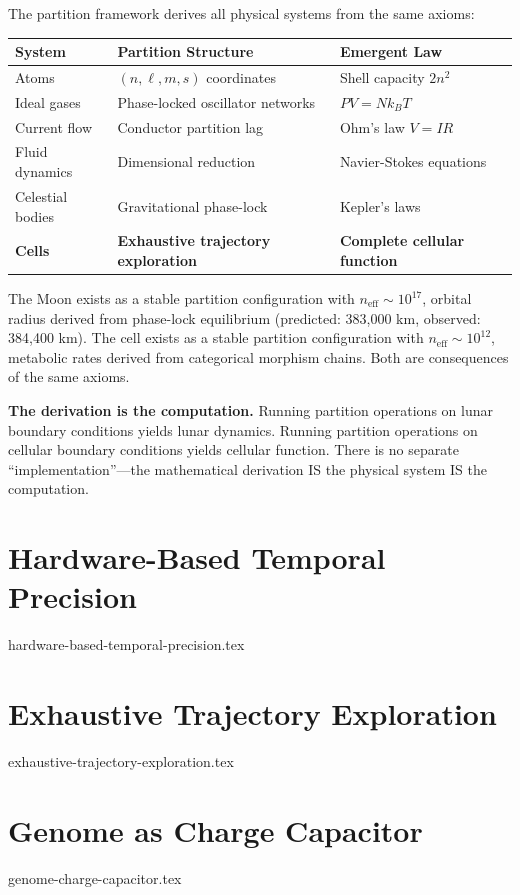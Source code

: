\documentclass[11pt,a4paper]{article}
\theoremstyle{remark}
\begin{document}
The partition framework derives all physical systems from the same axioms:

\begin{center}
\begin{tabular}{lll}
\toprule
\textbf{System} & \textbf{Partition Structure} & \textbf{Emergent Law} \\
\midrule
Atoms & $(n, \ell, m, s)$ coordinates & Shell capacity $2n^2$ \\
Ideal gases & Phase-locked oscillator networks & $PV = Nk_BT$ \\
Current flow & Conductor partition lag & Ohm's law $V = IR$ \\
Fluid dynamics & Dimensional reduction & Navier-Stokes equations \\
Celestial bodies & Gravitational phase-lock & Kepler's laws \\
\textbf{Cells} & \textbf{Exhaustive trajectory exploration} & \textbf{Complete cellular function} \\
\bottomrule
\end{tabular}
\end{center}

The Moon exists as a stable partition configuration with $n_{\text{eff}} \sim 10^{17}$, orbital radius derived from phase-lock equilibrium (predicted: 383,000 km, observed: 384,400 km). The cell exists as a stable partition configuration with $n_{\text{eff}} \sim 10^{12}$, metabolic rates derived from categorical morphism chains. Both are consequences of the same axioms.

\textbf{The derivation is the computation.} Running partition operations on lunar boundary conditions yields lunar dynamics. Running partition operations on cellular boundary conditions yields cellular function. There is no separate ``implementation''---the mathematical derivation IS the physical system IS the computation.

\section{Hardware-Based Temporal Precision}
{hardware-based-temporal-precision.tex}

\section{Exhaustive Trajectory Exploration}
{exhaustive-trajectory-exploration.tex}

\section{Genome as Charge Capacitor}
{genome-charge-capacitor.tex}
\end{document}
